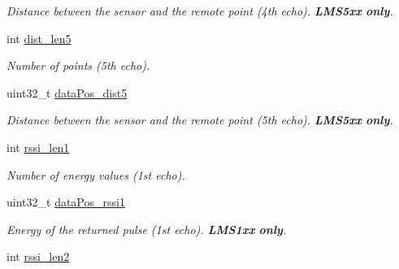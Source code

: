 \begin{DoxyCompactItemize}
\begin{DoxyCompactList}\small\item\em Distance between the sensor and the remote point (4th echo). {\bfseries L\-M\-S5xx} {\bfseries only}. \end{DoxyCompactList}\item 
\hypertarget{structpacpus_1_1SickLMS__dbt_a3e57b76ae42d4ef76b065f6caf09d3ba}{int \hyperlink{structpacpus_1_1SickLMS__dbt_a3e57b76ae42d4ef76b065f6caf09d3ba}{dist\-\_\-len5}}\label{structpacpus_1_1SickLMS__dbt_a3e57b76ae42d4ef76b065f6caf09d3ba}

\begin{DoxyCompactList}\small\item\em Number of points (5th echo). \end{DoxyCompactList}\item 
\hypertarget{structpacpus_1_1SickLMS__dbt_ad46c09e76ba9eb92dba67aaa52d42322}{uint32\-\_\-t \hyperlink{structpacpus_1_1SickLMS__dbt_ad46c09e76ba9eb92dba67aaa52d42322}{data\-Pos\-\_\-dist5}}\label{structpacpus_1_1SickLMS__dbt_ad46c09e76ba9eb92dba67aaa52d42322}

\begin{DoxyCompactList}\small\item\em Distance between the sensor and the remote point (5th echo). {\bfseries L\-M\-S5xx} {\bfseries only}. \end{DoxyCompactList}\item 
\hypertarget{structpacpus_1_1SickLMS__dbt_a28db8f5f2eb2b3f7674fed018d68a753}{int \hyperlink{structpacpus_1_1SickLMS__dbt_a28db8f5f2eb2b3f7674fed018d68a753}{rssi\-\_\-len1}}\label{structpacpus_1_1SickLMS__dbt_a28db8f5f2eb2b3f7674fed018d68a753}

\begin{DoxyCompactList}\small\item\em Number of energy values (1st echo). \end{DoxyCompactList}\item 
\hypertarget{structpacpus_1_1SickLMS__dbt_a944d22badb118ea88ce24e308e25b50d}{uint32\-\_\-t \hyperlink{structpacpus_1_1SickLMS__dbt_a944d22badb118ea88ce24e308e25b50d}{data\-Pos\-\_\-rssi1}}\label{structpacpus_1_1SickLMS__dbt_a944d22badb118ea88ce24e308e25b50d}

\begin{DoxyCompactList}\small\item\em Energy of the returned pulse (1st echo). {\bfseries L\-M\-S1xx} {\bfseries only}. \end{DoxyCompactList}\item 
\hypertarget{structpacpus_1_1SickLMS__dbt_a99fb6cb7c53cb0115a82e7414a60ffcd}{int \hyperlink{structpacpus_1_1SickLMS__dbt_a99fb6cb7c53cb0115a82e7414a60ffcd}{rssi\-\_\-len2}}\label{structpacpus_1_1SickLMS__dbt_a99fb6cb7c53cb0115a82e7414a60ffcd}


\end{DoxyCompactItemize}
